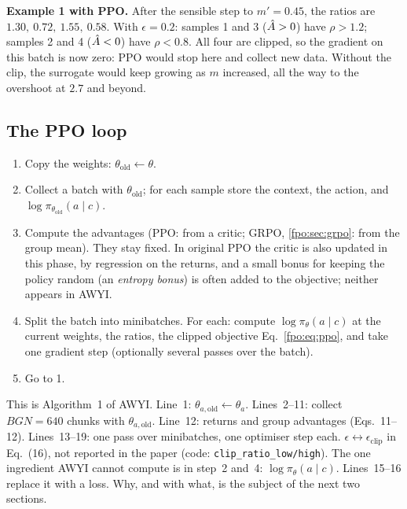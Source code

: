 \textbf{Example 1 with PPO.} After the sensible step to $m'=0.45$, the ratios are $1.30,\ 0.72,\ 1.55,\ 0.58$. With $\epsilon=0.2$: samples 1 and 3 ($\hat A>0$) have $\rho>1.2$; samples 2 and 4 ($\hat A<0$) have $\rho<0.8$. All four are clipped, so the gradient on this batch is now zero: PPO would stop here and collect new data. Without the clip, the surrogate would keep growing as $m$ increased, all the way to the overshoot at $2.7$ and beyond.

\subsection{The PPO loop}
\begin{enumerate}
\item Copy the weights: $\theta_{\mathrm{old}}\leftarrow\theta$.
\item Collect a batch with $\theta_{\mathrm{old}}$; for each sample store the context, the action, and $\log\pi_{\theta_{\mathrm{old}}}(a\mid c)$.
\item Compute the advantages (PPO: from a critic; GRPO, \cref{fpo:sec:grpo}: from the group mean). They stay fixed. In original PPO the critic is also updated in this phase, by regression on the returns, and a small bonus for keeping the policy random (an \emph{entropy bonus}) is often added to the objective; neither appears in AWYI.
\item Split the batch into minibatches. For each: compute $\log\pi_\theta(a\mid c)$ at the current weights, the ratios, the clipped objective Eq.~\eqref{fpo:eq:ppo}, and take one gradient step (optionally several passes over the batch).
\item Go to 1.
\end{enumerate}

\begin{paperlink}
This is Algorithm~1 of AWYI. Line~1: $\theta_{a,\mathrm{old}}\leftarrow\theta_a$. Lines~2--11: collect $BGN=640$ chunks with $\theta_{a,\mathrm{old}}$. Line~12: returns and group advantages (Eqs.~11--12). Lines~13--19: one pass over minibatches, one optimiser step each. $\epsilon\leftrightarrow\epsilon_{\mathrm{clip}}$ in Eq.~(16), not reported in the paper (code: \texttt{clip\_ratio\_low/high}). The one ingredient AWYI cannot compute is in step~2 and~4: $\log\pi_\theta(a\mid c)$. Lines~15--16 replace it with a loss. Why, and with what, is the subject of the next two sections.
\end{paperlink}

